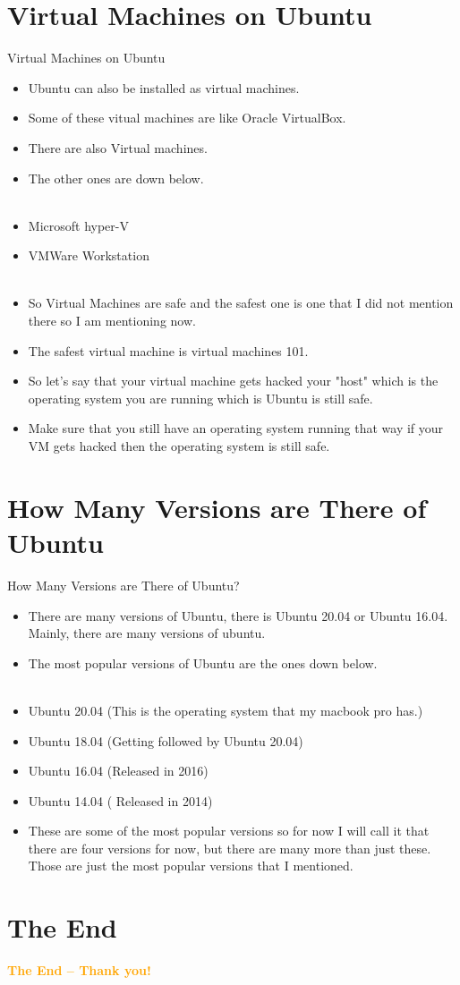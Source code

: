 \documentclass[aspectratio=43]{beamer}
\begin{document}
\section{Virtual Machines on Ubuntu}
\begin{frame}{Virtual Machines on Ubuntu}
\begin{itemize}
\item Ubuntu can also be installed as virtual machines.
\item Some of these vitual machines are like Oracle VirtualBox.
\item There are also Virtual machines. 
\item The other ones are down below.
\\
~\\
\item Microsoft hyper-V
\item VMWare Workstation
\\
~\\
\item So Virtual Machines are safe and the safest one is one that I did not mention there so I am mentioning now.
\item The safest virtual machine is virtual machines 101.
\item So let's say that your virtual machine gets hacked your "host" which is the operating system you are running which is Ubuntu is still safe.
\item Make sure that you still have an operating system running that way if your VM gets hacked then the operating system is still safe.
\end{itemize}
\end{frame}
\section{How Many Versions are There of Ubuntu}
\begin{frame}{How Many Versions are There of Ubuntu?}
\begin{itemize}
\item There are many versions of Ubuntu, there is Ubuntu 20.04 or Ubuntu 16.04. Mainly, there are many versions of ubuntu.
\item The most popular versions of Ubuntu are the ones down below.
\\
~\\
\item Ubuntu 20.04 (This is the operating system that my macbook pro has.)
\item Ubuntu 18.04 (Getting followed by Ubuntu 20.04)
\item Ubuntu 16.04 (Released in 2016)
\item Ubuntu 14.04 ( Released in 2014)
\item These are some of the most popular versions so for now I will call it that there are four versions for now, but there are many more than just these. Those are just the most popular versions that I mentioned. 
\end{itemize}
\end{frame}

	
\section{The End}
    \begin{frame}{ }
        \centering
            \Huge\bfseries
        \textcolor{orange}{The End -- Thank you!}
    \end{frame}
\end{document}
